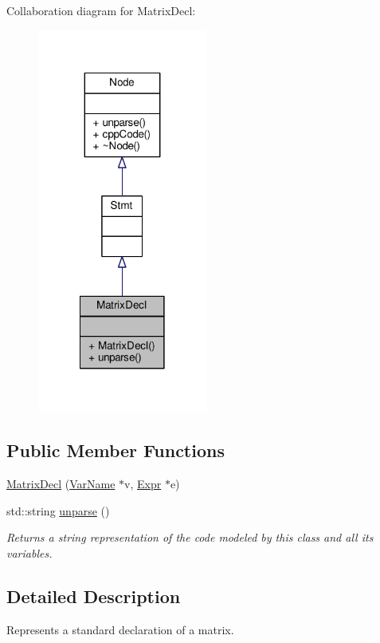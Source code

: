 Collaboration diagram for Matrix\-Decl\-:\nopagebreak
\begin{figure}[H]
\begin{center}
\leavevmode
\includegraphics[width=158pt]{classMatrixDecl__coll__graph}
\end{center}
\end{figure}
\subsection*{Public Member Functions}
\begin{DoxyCompactItemize}
\item 
\hyperlink{classMatrixDecl_a8547ecfc238547a828bc43374fe42833}{Matrix\-Decl} (\hyperlink{classVarName}{Var\-Name} $\ast$v, \hyperlink{classExpr}{Expr} $\ast$e)
\item 
std\-::string \hyperlink{classMatrixDecl_a060b7cc8af5fd4cb10e045321b39d397}{unparse} ()
\begin{DoxyCompactList}\small\item\em Returns a string representation of the code modeled by this class and all its variables. \end{DoxyCompactList}\end{DoxyCompactItemize}


\subsection{Detailed Description}
Represents a standard declaration of a matrix. \par
 

